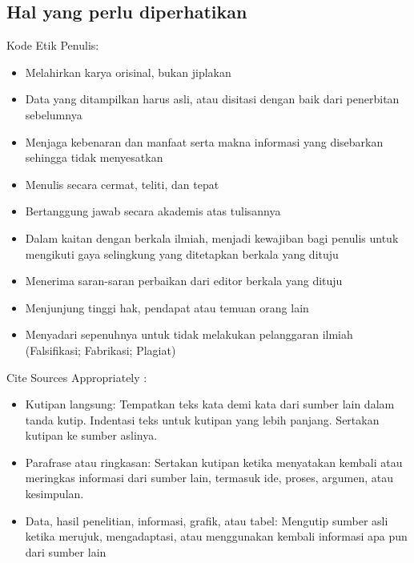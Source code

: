 \documentclass{article}
\begin{document}
\subsection{Hal yang perlu diperhatikan}
Kode Etik Penulis:
\begin{itemize}
    \item Melahirkan karya orisinal, bukan jiplakan
    \item Data yang ditampilkan harus asli, atau disitasi dengan baik dari penerbitan sebelumnya
    \item Menjaga kebenaran dan manfaat serta makna informasi yang disebarkan sehingga tidak menyesatkan
    \item Menulis secara cermat, teliti, dan tepat
    \item Bertanggung jawab secara akademis atas tulisannya
    \item Dalam kaitan dengan berkala ilmiah, menjadi kewajiban bagi penulis untuk mengikuti gaya selingkung yang ditetapkan berkala yang dituju
    \item Menerima saran-saran perbaikan dari editor berkala yang dituju
    \item Menjunjung tinggi hak, pendapat atau temuan orang lain
    \item Menyadari sepenuhnya untuk tidak melakukan pelanggaran ilmiah (Falsifikasi; Fabrikasi; Plagiat)
\end{itemize}
Cite Sources Appropriately :
\begin{itemize}
    \item Kutipan langsung: Tempatkan teks kata demi kata dari sumber lain dalam tanda kutip. Indentasi teks untuk kutipan yang lebih panjang. Sertakan kutipan ke sumber aslinya.
    \item Parafrase atau ringkasan: Sertakan kutipan ketika menyatakan kembali atau meringkas informasi dari sumber lain, termasuk ide, proses, argumen, atau kesimpulan.
    \item Data, hasil penelitian, informasi, grafik, atau tabel: Mengutip sumber asli ketika merujuk, mengadaptasi, atau menggunakan kembali informasi apa pun dari sumber lain
\end{itemize}
\end{document}

